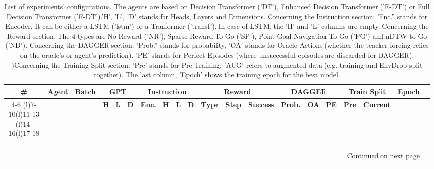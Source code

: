 \begin{longtable}{@{\hskip3pt}c@{\hskip3pt}c@{\hskip3pt}c@{\hskip3pt}c@{\hskip3pt}c@{\hskip3pt}c@{\hskip3pt}c@{\hskip3pt}c@{\hskip3pt}c@{\hskip3pt}c@{\hskip3pt}c@{\hskip3pt}c@{\hskip3pt}c@{\hskip3pt}c@{\hskip3pt}c@{\hskip3pt}c@{\hskip3pt}c@{\hskip3pt}c@{\hskip3pt}c@{\hskip3pt}c}
\caption{List of experiments' configurations. \newline The agents are based on Decision Transformer ('DT'), Enhanced Decision Transformer ('E-DT') or Full Decision Transformer ('F-DT').\newline 'H', 'L', 'D' stands for Heads, Layers and Dimensions. \newline Concerning the Instruction section: 'Enc.'' stands for Encoder. It can be either a LSTM ('lstm') or a Tranformer ('transf'). In case of LSTM, the 'H' and 'L' columns are empty. \newline Concerning the Reward section: The 4 types are No Reward ('NR'),  Sparse Reward To Go ('SP'), Point Goal Navigation To Go ('PG') and nDTW to Go ('ND'). \newline Concerning the DAGGER section: 'Prob.'' stands for probability, 'OA' stands for Oracle Actions (whether the teacher forcing relies on the oracle's or agent's prediction). 'PE' stands for Perfect Episodes (where unsuccessful episodes are discarded for DAGGER). )\newline Concerning the Training Split section: 'Pre' stands for Pre-Training. 'AUG' refers to augmented data (e.g. training and EnvDrop split together). The last column, 'Epoch' shows the training epoch for the best model.}\\
\toprule
\textbf{\#} & \textbf{Agent} & \textbf{Batch} & \multicolumn{3}{c}{\textbf{GPT}} & \multicolumn{4}{c}{\textbf{Instruction}} & \multicolumn{3}{c}{\textbf{Reward}} & \multicolumn{3}{c}{\textbf{DAGGER}} & \multicolumn{2}{c}{\textbf{Train Split}} & \textbf{Epoch} \\
\cmidrule(l){4-6} \cmidrule(l){7-10}\cmidrule(l){11-13} \cmidrule(l){14-16}\cmidrule(l){17-18} \textbf{~} &     \textbf{~} &     \textbf{~} &   \textbf{H} & \textbf{L} & \textbf{D} &        \textbf{Enc.} & \textbf{H} & \textbf{L} & \textbf{D} &   \textbf{Type} & \textbf{Step} & \textbf{Success} &  \textbf{Prob.} & \textbf{OA} & \textbf{PE} &         \textbf{Pre} & \textbf{Current} &     \textbf{~} \\
\midrule
\endhead
\midrule
\multicolumn{19}{r}{{Continued on next page}} \\
\midrule
\endfoot


\end{longtable}
